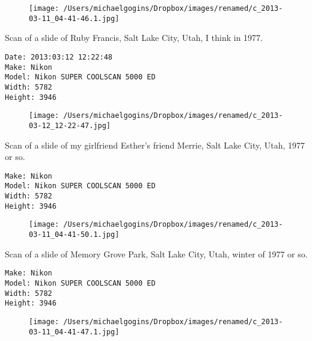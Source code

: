\documentclass[11pt,letter,DIV=14,paper=landscape]{scrbook}
\begin{document}
\begin{figure}
\texttt{[image: /Users/michaelgogins/Dropbox/images/renamed/c\_2013-03-11\_04-41-46.1.jpg]}
\end{figure}
    
\clearpage
\noindent Scan of a slide of Ruby Francis, Salt Lake City, Utah, I think in 1977.
\noindent
\begin{lstlisting}
Date: 2013:03:12 12:22:48
Make: Nikon
Model: Nikon SUPER COOLSCAN 5000 ED
Width: 5782
Height: 3946
\end{lstlisting}
\clearpage

\begin{figure}
\texttt{[image: /Users/michaelgogins/Dropbox/images/renamed/c\_2013-03-12\_12-22-47.jpg]}
\end{figure}
    
\clearpage
\noindent Scan of a slide of my girlfriend Esther's friend Merrie, Salt Lake City, Utah, 1977 or so.
\noindent
\begin{lstlisting}
Make: Nikon
Model: Nikon SUPER COOLSCAN 5000 ED
Width: 5782
Height: 3946
\end{lstlisting}
\clearpage

\begin{figure}
\texttt{[image: /Users/michaelgogins/Dropbox/images/renamed/c\_2013-03-11\_04-41-50.1.jpg]}
\end{figure}
    
\clearpage
\noindent Scan of a slide of Memory Grove Park, Salt Lake City, Utah, winter of 1977 or so.
\noindent
\begin{lstlisting}
Make: Nikon
Model: Nikon SUPER COOLSCAN 5000 ED
Width: 5782
Height: 3946
\end{lstlisting}
\clearpage

\begin{figure}
\texttt{[image: /Users/michaelgogins/Dropbox/images/renamed/c\_2013-03-11\_04-41-47.1.jpg]}
\end{figure}
    
\end{document}
